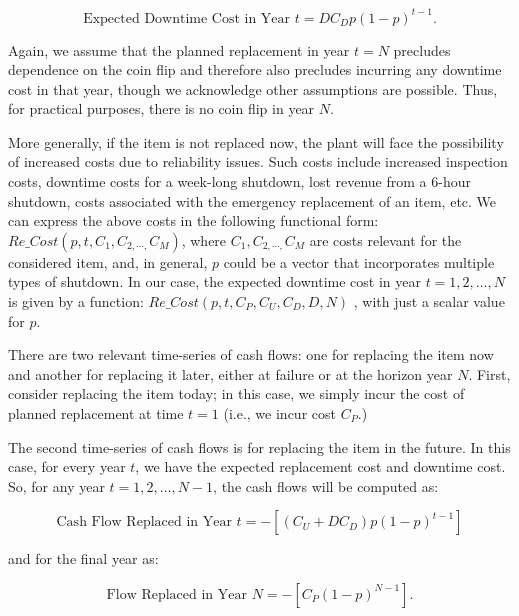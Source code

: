 \begin{equation}\label{npv_3}
\mbox{Expected Downtime Cost in Year }t=DC_{D}p \left( 1-p \right) ^{t-1}.
\end{equation}

Again, we assume that the planned replacement in year  \( t=N \)  precludes dependence
on the coin flip and therefore also precludes incurring any downtime cost in that year,
though we acknowledge other assumptions are possible. Thus, for practical purposes,
there is no coin flip in year  \( N. \)

More generally, if the item is not replaced now, the plant will face the possibility
of increased costs due to reliability issues. Such costs include increased
inspection costs, downtime costs for a week-long shutdown, lost revenue from a 6-hour
shutdown, costs associated with the emergency replacement of an item, etc. We can express
the above costs in the following functional form:
\( Re \_ Cost \left( p,t,C_{1},C_{2, \cdots , }C_{M} \right)  \),
where  \( C_{1},C_{2, \cdots, }C_{M} \)  are costs relevant for the considered item, and,
in general,  \( p \)  could be a vector that incorporates multiple types of shutdown. In
our case, the expected downtime cost in year  \( t=1, 2, \ldots ,N \)  is given by a function:
\( Re \_ Cost \left( p,t,C_{P},C_{U},C_{D},D,N \right)  \) , with just a scalar value for  \( p \).

There are two relevant time-series of cash flows: one for replacing the item now and
another for replacing it later, either at failure or at the horizon year  \( N \).
First, consider replacing the item today; in this case, we simply incur the cost of
planned replacement at time  \( t=1 \) (i.e., we incur cost  \( C_{P} \).)

The second time-series of cash flows is for replacing the item in the future.
In this case, for every year  \( t \), we have the expected replacement cost
and downtime cost. So, for any year  \( t=1, 2, \ldots ,N-1 \), the cash
flows will be computed as:\par

\begin{equation}\label{npv_4}
\mbox{Cash Flow Replaced in Year }t= - \left[  \left( C_{U}+DC_{D} \right)  p \left( 1-p \right) ^{t-1} \right]
\end{equation}


and for the final year as:\par

\begin{equation}\label{npv_5}
\mbox{Flow Replaced in Year }N= - \left[ C_{P} \left( 1-p \right) ^{N-1} \right] .
\end{equation}


